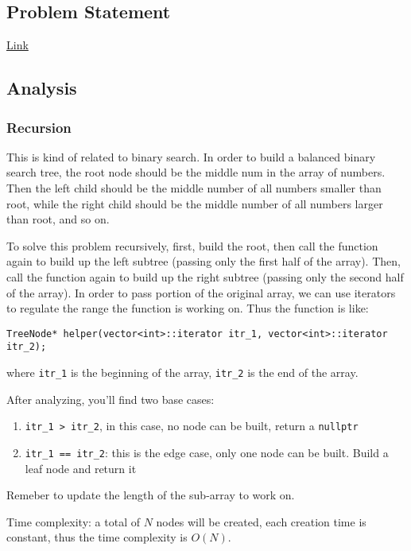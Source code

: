 \documentclass[12pt]{article}
\begin{document}
\subsection{Problem Statement}
\label{sec:orgc95d943}
\href{https://leetcode.com/problems/convert-sorted-array-to-binary-search-tree/}{Link}
\subsection{Analysis}
\label{sec:org7c1ae5f}
\subsubsection{Recursion}
\label{sec:org3c3d031}
This is kind of related to binary search. In order to build a balanced binary search tree, the root node should be the middle num in the array of numbers. Then the left child should be the middle number of all numbers smaller than root, while the right child should be the middle number of all numbers larger than root, and so on.

To solve this problem recursively, first, build the root, then call the function again to build up the left subtree (passing only the first half of the array). Then, call the function again to build up the right subtree (passing only the second half of the array). In order to pass portion of the original array, we can use iterators to regulate the range the function is working on. Thus the function is like:
\begin{verbatim}
TreeNode* helper(vector<int>::iterator itr_1, vector<int>::iterator itr_2);
\end{verbatim}
where \texttt{itr\_1} is the beginning of the array, \texttt{itr\_2} is the end of the array.

After analyzing, you'll find two base cases:
\begin{enumerate}
\item \texttt{itr\_1 > itr\_2}, in this case, no node can be built, return a \texttt{nullptr}
\item \texttt{itr\_1 == itr\_2}: this is the edge case, only one node can be built. Build a leaf node and return it
\end{enumerate}

Remeber to update the length of the sub-array to work on.

Time complexity: a total of \(N\) nodes will be created, each creation time is constant, thus the time complexity is \(O(N)\).
\end{document}
